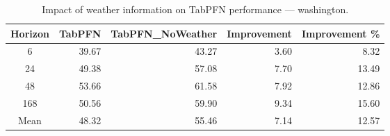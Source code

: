\begin{table}
\centering
\caption{Impact of weather information on TabPFN performance — washington.}
\label{tab:tabpfn_weather_washington}
\begin{tabular}{crrrr}
\toprule
Horizon & TabPFN & TabPFN\_NoWeather & Improvement & Improvement \% \\
\midrule
6 & 39.67 & 43.27 & 3.60 & 8.32 \\
24 & 49.38 & 57.08 & 7.70 & 13.49 \\
48 & 53.66 & 61.58 & 7.92 & 12.86 \\
168 & 50.56 & 59.90 & 9.34 & 15.60 \\
\midrule
Mean & 48.32 & 55.46 & 7.14 & 12.57 \\
\bottomrule
\end{tabular}
\end{table}
